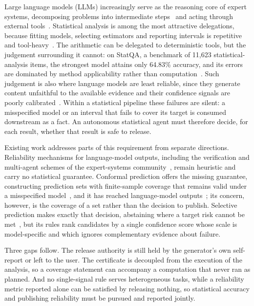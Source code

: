 \documentclass[preprint,12pt,authoryear]{elsarticle}
\begin{document}
{\color{blue}
Large language models (LLMs) increasingly serve as the reasoning core of expert systems, decomposing problems into intermediate steps~\citep{wei2022chain,kojima2022large,wang2023self} and acting through external tools~\citep{yao2023react,schick2023toolformer}. Statistical analysis is among the most attractive delegations, because fitting models, selecting estimators and reporting intervals is repetitive and tool-heavy~\citep{sun2026survey}. The arithmetic can be delegated to deterministic tools, but the judgement surrounding it cannot: on StatQA, a benchmark of 11{,}623 statistical-analysis items, the strongest model attains only 64.83\% accuracy, and its errors are dominated by method applicability rather than computation~\citep{zhu2024large}. Such judgement is also where language models are least reliable, since they generate content unfaithful to the available evidence and their confidence signals are poorly calibrated~\citep{ji2023survey,guo2017calibration,kadavath2022language}. Within a statistical pipeline these failures are silent: a misspecified model or an interval that fails to cover its target is consumed downstream as a fact. An autonomous statistical agent must therefore decide, for each result, whether that result is safe to release.

Existing work addresses parts of this requirement from separate directions. Reliability mechanisms for language-model outputs, including the verification and multi-agent schemes of the expert-systems community~\citep{shi2025mitigating,he2026enhancing}, remain heuristic and carry no statistical guarantee. Conformal prediction offers the missing guarantee, constructing prediction sets with finite-sample coverage that remains valid under a misspecified model~\citep{lei2018distribution,angelopoulos2023gentle,angelopoulos2024conformal}, and it has reached language-model outputs~\citep{campos2024conformal,wang2024conu,cherian2024large}; its concern, however, is the coverage of a set rather than the decision to publish. Selective prediction makes exactly that decision, abstaining where a target risk cannot be met~\citep{chow1970optimum,elyaniv2010foundations,geifman2017selective,geifman2019selectivenet}, but its rules rank candidates by a single confidence score whose scale is model-specific and which ignores complementary evidence about failure.

Three gaps follow. The release authority is still held by the generator's own self-report or left to the user. The certificate is decoupled from the execution of the analysis, so a coverage statement can accompany a computation that never ran as planned. And no single-signal rule serves heterogeneous tasks, while a reliability metric reported alone can be satisfied by releasing nothing, so statistical accuracy and publishing reliability must be pursued and reported jointly.

}
\end{document}
